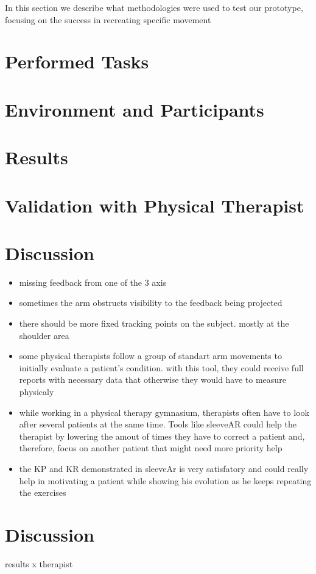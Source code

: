 In this section we describe what methodologies were used to test our prototype, focusing on the success in recreating specific movement

\section{Performed Tasks} \label{evaluation-tasks}

\section{Environment and Participants} 


\section{Results}

\section{Validation with Physical Therapist}

\section{Discussion}

\begin{itemize}
\item missing feedback from one of the 3 axis 
\item sometimes the arm obstructs visibility to the feedback being projected
\item there should be more fixed tracking points on the subject. mostly at the shoulder area
\item some physical therapists follow a group of standart arm movements to initially evaluate a patient's condition. with this tool, they could receive full reports with necessary data that otherwise they would have to measure physicaly
\item while working in a physical therapy gymnasium, therapists often have to look after several patients at the same time. Tools like sleeveAR could help the therapist by lowering the amout of times they have to correct a patient and, therefore, focus on another patient that might need more priority help
\item the \ac{KP} and \ac{KR} demonstrated in sleeveAr is very satisfatory and could really help in motivating a patient while showing his evolution as he keeps repeating the exercises
\end{itemize}



\section{Discussion}

results x therapist 